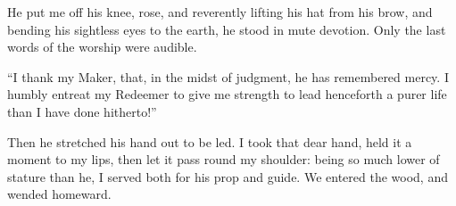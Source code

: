 He put me off his knee, rose, and reverently lifting his hat from his
brow, and bending his sightless eyes to the earth, he stood in mute
devotion. Only the last words of the worship were audible.

\enquote{I thank my Maker, that, in the midst of judgment, he has
remembered mercy. I humbly entreat my Redeemer to give me strength to
lead henceforth a purer life than I have done hitherto!}

Then he stretched his hand out to be led. I took that dear hand, held
it a moment to my lips, then let it pass round my shoulder: being so
much lower of stature than he, I served both for his prop and guide. We
entered the wood, and wended homeward.
